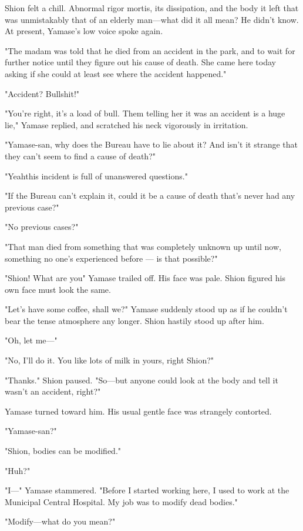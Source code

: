 Shion felt a chill. Abnormal rigor mortis, its dissipation, and the body
it left that was unmistakably that of an elderly man---what did it all
mean? He didn't know. At present, Yamase's low voice spoke again.

"The madam was told that he died from an accident in the park, and to
wait for further notice until they figure out his cause of death. She
came here today asking if she could at least see where the accident
happened."

"Accident? Bullshit!"

"You're right, it's a load of bull. Them telling her it was an accident
is a huge lie," Yamase replied, and scratched his neck vigorously in
irritation.

"Yamase-san, why does the Bureau have to lie about it? And isn't it
strange that they can't seem to find a cause of death?"

"Yeah\el this incident is full of unanswered questions."

"If the Bureau can't explain it, could it be a cause of death that's
never had any previous case?"

"No previous cases?"

"That man died from something that was completely unknown up until now,
something no one's experienced before --- is that possible?"

"Shion! What are you\el " Yamase trailed off. His face was pale. Shion
figured his own face must look the same.

"Let's have some coffee, shall we?" Yamase suddenly stood up as if he
couldn't bear the tense atmosphere any longer. Shion hastily stood up
after him.

"Oh, let me---"

"No, I'll do it. You like lots of milk in yours, right Shion?"

"Thanks." Shion paused. "So---but anyone could look at the body and tell
it wasn't an accident, right?"

Yamase turned toward him. His usual gentle face was strangely contorted.

"Yamase-san?"

"Shion, bodies can be modified."

"Huh?"

"I---" Yamase stammered. "Before I started working here, I used to work at
the Municipal Central Hospital. My job was to modify dead bodies."

"Modify---what do you mean?"

